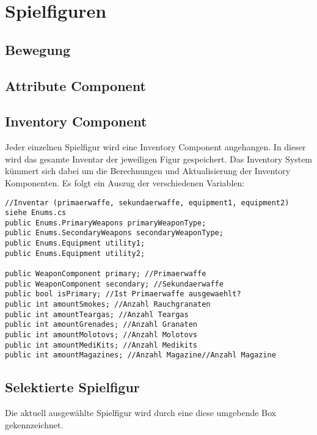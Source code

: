 \chapter{Spielfiguren}

\section{Bewegung}

\section{Attribute Component}


\section{Inventory Component}
Jeder einzelnen Spielfigur wird eine Inventory Component angehangen. In dieser wird das gesamte Inventar der jeweiligen Figur gespeichert. Das Inventory System kümmert sich dabei um die Berechnungen und Aktualisierung der Inventory Komponenten.\newline
Es folgt ein Auszug der verschiedenen Variablen:\newline

\begin{lstlisting}[breaklines = true]
//Inventar (primaerwaffe, sekundaerwaffe, equipment1, equipment2) siehe Enums.cs    
public Enums.PrimaryWeapons primaryWeaponType;
public Enums.SecondaryWeapons secondaryWeaponType;
public Enums.Equipment utility1;
public Enums.Equipment utility2;

public WeaponComponent primary; //Primaerwaffe
public WeaponComponent secondary; //Sekundaerwaffe
public bool isPrimary; //Ist Primaerwaffe ausgewaehlt? 
public int amountSmokes; //Anzahl Rauchgranaten
public int amountTeargas; //Anzahl Teargas
public int amountGrenades; //Anzahl Granaten
public int amountMolotovs; //Anzahl Molotovs
public int amountMediKits; //Anzahl Medikits
public int amountMagazines; //Anzahl Magazine//Anzahl Magazine
\end{lstlisting}

\section{Selektierte Spielfigur}
Die aktuell ausgewählte Spielfigur wird durch eine diese umgebende Box gekennzeichnet.
